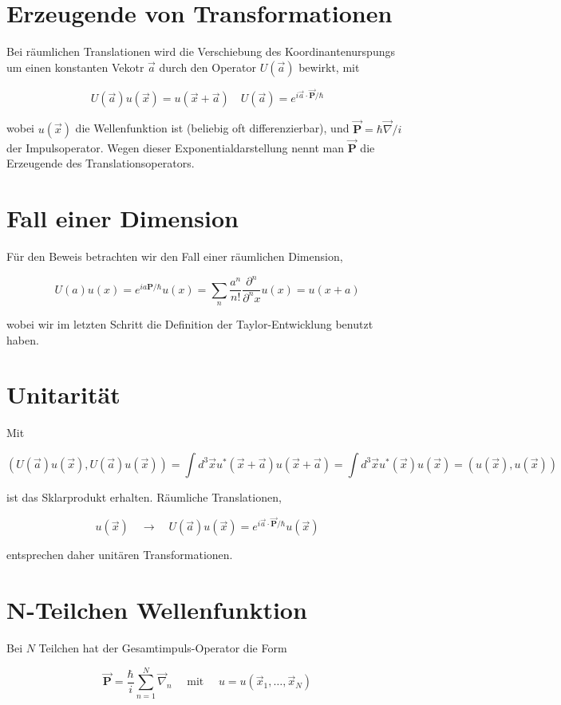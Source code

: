 \documentclass[10pt, letterpaper]{article}
\begin{document}
\section*{Erzeugende von Transformationen}
Bei räumlichen Translationen wird die Verschiebung des Koordinantenurspungs um einen konstanten Vekotr $\vec{a}$ durch den Operator $U(\vec{a})$ bewirkt, mit

$$
U(\vec{a}) u(\vec{x})=u(\vec{x}+\vec{a}) \quad U(\vec{a})=e^{i \vec{a} \cdot \overrightarrow{\mathbf{P}} / \hbar}
$$

wobei $u(\vec{x})$ die Wellenfunktion ist (beliebig oft differenzierbar), und $\overrightarrow{\mathbf{P}}=\hbar \vec{\nabla} / i$ der Impulsoperator. Wegen dieser Exponentialdarstellung nennt man $\overrightarrow{\mathbf{P}}$ die Erzeugende des Translationsoperators.

\section*{Fall einer Dimension}
Für den Beweis betrachten wir den Fall einer räumlichen Dimension,

$$
U(a) u(x)=e^{i a \mathbf{P} / \hbar} u(x)=\sum_{n} \frac{a^{n}}{n!} \frac{\partial^{n}}{\partial^{n} x} u(x)=u(x+a)
$$

wobei wir im letzten Schritt die Definition der Taylor-Entwicklung benutzt haben.

\section*{Unitarität}
Mit

$$
(U(\vec{a}) u(\vec{x}), U(\vec{a}) u(\vec{x}))=\int d^{3} \vec{x} u^{*}(\vec{x}+\vec{a}) u(\vec{x}+\vec{a})=\int d^{3} \vec{x} u^{*}(\vec{x}) u(\vec{x})=(u(\vec{x}), u(\vec{x}))
$$

ist das Sklarprodukt erhalten. Räumliche Translationen,

$$
u(\vec{x}) \quad \rightarrow \quad U(\vec{a}) u(\vec{x})=e^{i \vec{a} \cdot \overrightarrow{\mathbf{P}} / \hbar} u(\vec{x})
$$

entsprechen daher unitären Transformationen.

\section*{N-Teilchen Wellenfunktion}
Bei $N$ Teilchen hat der Gesamtimpuls-Operator die Form

$$
\overrightarrow{\mathbf{P}}=\frac{\hbar}{i} \sum_{n=1}^{N} \vec{\nabla}_{n} \quad \text { mit } \quad u=u\left(\vec{x}_{1}, \ldots, \vec{x}_{N}\right)
$$
\end{document}
